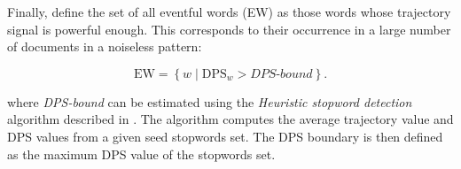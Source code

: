 Finally, \cite{event-detection} define the set of all eventful words (EW) as those words whose trajectory signal is powerful enough. This corresponds to their occurrence in a large number of documents in a noiseless pattern:

\begin{equation}
	\text{EW} = \left\{ w \mid \text{DPS}_{w} > \textit{DPS-bound} \right\}.
\end{equation}

where \textit{DPS-bound} can be estimated using the \textit{Heuristic stopword detection} algorithm described in \cite{event-detection}. The algorithm computes the average trajectory value and DPS values from a given seed stopwords set. The DPS boundary is then defined as the maximum DPS value of the stopwords set.
